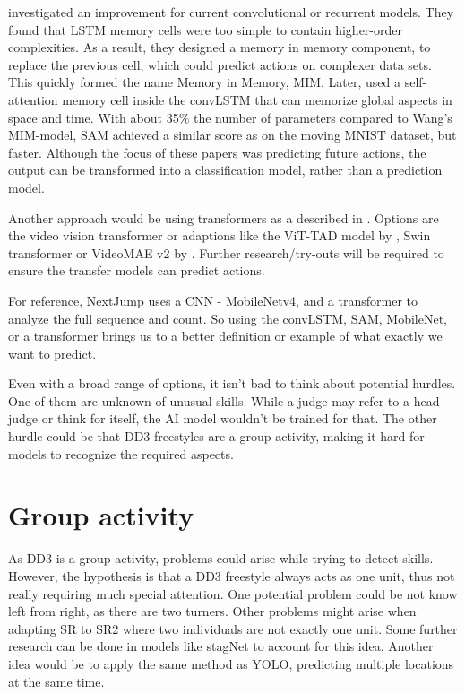 \textcite{Wang_2019} investigated an improvement for current convolutional or recurrent models. They found that LSTM memory cells were too simple to contain higher-order complexities. As a result, they designed a memory in memory component, to replace the previous cell, which could predict actions on complexer data sets. This quickly formed the name Memory in Memory, MIM. Later, \textcite{Lin_2020} used a self-attention memory cell inside the convLSTM that can memorize global aspects in space and time. With about 35\% the number of parameters compared to Wang's MIM-model, SAM achieved a similar score as on the moving MNIST dataset, but faster. Although the focus of these papers was predicting future actions, the output can be transformed into a classification model, rather than a prediction model.

Another approach would be using transformers as a described  in \textcite{Yin_2024}. Options are the video vision transformer \autocite{Arnab2021} or adaptions like the ViT-TAD model by \textcite{Yang_2023}, Swin transformer \textcite{Liu_2021} or VideoMAE v2 by \textcite{Wang_2023}. Further research/try-outs will be required to ensure the transfer models can predict actions.

For reference, NextJump uses a CNN - MobileNetv4, \autocite{MobileNetv4_2024} and a transformer to analyze the full sequence and count. So using the convLSTM, SAM, MobileNet, or a transformer brings us to a better definition or example of what exactly we want to predict.


Even with a broad range of options, it isn't bad to think about potential hurdles. One of them are unknown of unusual skills. While a judge may refer to a head judge or think for itself, the AI model wouldn't be trained for that. The other hurdle could be that DD3 freestyles are a group activity, making it hard for models to recognize the required aspects. 

\section{Group activity}

As DD3 is a group activity, problems could arise while trying to detect skills. However, the hypothesis is that a DD3 freestyle always acts as one unit, thus not really requiring much special attention. One potential problem could be not know left from right, as there are two turners. Other problems might arise when adapting SR to SR2 where two individuals are not exactly one unit. Some further research can be done in models like stagNet \autocite{Qi_2020} to account for this idea. Another idea would be to apply the same method as YOLO, predicting multiple locations at the same time.




